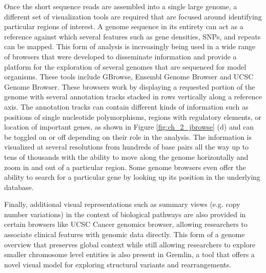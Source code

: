Once the short sequence reads are assembled into a single large genome, a different set of visualization tools are required that are focused around identifying particular regions of interest. A genome sequence in its entirety can act as a reference against which several features such as gene densities, SNPs, and repeats can be mapped. This form of analysis is increasingly being used in a wide range of browsers that were developed to disseminate information and provide a platform for the exploration of several genomes that are sequenced for model organisms. These tools include GBrowse\cite{stein2002generic}, Ensembl Genome Browser\cite{stalker2004ensembl} and UCSC Genome Browser\cite{ucscgenome}. These browsers work by displaying a requested portion of the genome with several annotation tracks stacked in rows vertically along a reference axis. The annotation tracks can contain different kinds of information such as positions of single nucleotide polymorphisms, regions with regulatory elements, or location of important genes, as shown in Figure \ref{fig:ch_2_jbrowse} (d) and can be toggled on or off depending on their role in the analysis. The information is visualized at several resolutions from hundreds of base pairs all the way up to tens of thousands with the ability to move along the genome horizontally and zoom in and out of a particular region. Some genome browsers even offer the ability to search for a particular gene by looking up its position in the underlying database\cite{nielsen2010visualizing}. 

Finally, additional visual representations such as summary views (e.g. copy number variations) in the context of biological pathways are also provided in certain browsers like UCSC Cancer genomics browser\cite{ucscgenome}, allowing researchers to associate clinical features with genomic data directly. This form of a genome overview that preserves global context while still allowing researchers to explore smaller chromosome level entities is also present in Gremlin, a tool that offers a novel visual model for exploring structural variants and rearrangements\cite{o2010gremlin}.  

